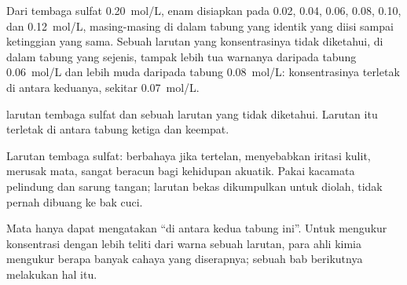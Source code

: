 \begin{example}\label{ex:g10:concentration-and-dilution:scale}
Dari  tembaga sulfat \qty{0.20}{mol/L}, enam  disiapkan pada 0.02, 0.04, 0.06, 0.08, 0.10, dan
\qty{0.12}{mol/L}, masing-masing di dalam tabung yang identik yang diisi
sampai ketinggian yang sama. Sebuah larutan yang konsentrasinya tidak
diketahui, di dalam tabung yang sejenis, tampak lebih tua warnanya
daripada tabung \qty{0.06}{mol/L} dan lebih muda daripada tabung
\qty{0.08}{mol/L}: konsentrasinya terletak di antara keduanya, sekitar
\qty{0.07}{mol/L}.
\end{example}

\begin{omfigure}

{\small {} larutan tembaga sulfat dan sebuah larutan yang
tidak diketahui. Larutan itu terletak di antara tabung ketiga dan
keempat.}
\end{omfigure}

\begin{safety}{}
Larutan tembaga sulfat: berbahaya jika tertelan, menyebabkan iritasi
kulit, merusak mata, sangat beracun bagi kehidupan akuatik. Pakai
kacamata pelindung dan sarung tangan; larutan bekas dikumpulkan untuk
diolah, tidak pernah dibuang ke bak cuci.
\end{safety}

\begin{remark}\label{rem:g10:concentration-and-dilution:eye}
Mata hanya dapat mengatakan ``di antara kedua tabung ini''. Untuk
mengukur konsentrasi dengan lebih teliti dari warna sebuah larutan, para
ahli kimia mengukur berapa banyak cahaya yang diserapnya; sebuah bab
berikutnya melakukan hal itu.
\end{remark}


